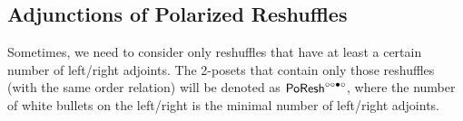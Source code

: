 \documentclass[a4paper]{memoir}
\begin{document}
%	

\subsection{Adjunctions of Polarized Reshuffles}
\begin{notation} \label{not:poresh-with}
	Sometimes, we need to consider only reshuffles that have at least a certain number of left/right adjoints. The 2-posets that contain only those reshuffles (with the same order relation) will be denoted as $\mathsf{PoResh}^{\circ \circ \bullet \circ}$, where the number of white bullets on the left/right is the minimal number of left/right adjoints.
\end{notation}
\end{document}
